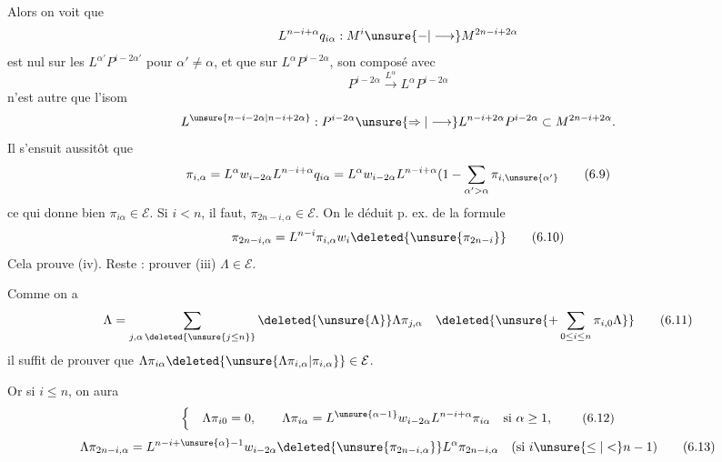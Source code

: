 Alors on voit que
\[
L^{n-i+\alpha}q_{i\alpha}:M^i\unsure{-|\longrightarrow}M^{2n-i+2\alpha}
\]
est nul sur les $L^{\alpha'}P^{i-2\alpha'}$ pour $\alpha'\neq\alpha$, et que sur $L^\alpha P^{i-2\alpha}$,  son composé avec
\[
P^{i-2\alpha}\xrightarrow{L^\alpha}L^\alpha P^{i-2\alpha}
\]
n'est autre que l'isom
\[
L^{\unsure{n-i-2\alpha|n-i+2\alpha}}:P^{i-2\alpha}\unsure{\Rightarrow|\longrightarrow}L^{n-i+2\alpha}P^{i-2\alpha}\subset M^{2n-i+2\alpha}.
\]
Il s'ensuit aussitôt que
\[
\pi_{i,\alpha}=L^\alpha w_{i-2\alpha}L^{n-i+\alpha}q_{i\alpha}=L^\alpha w_{i-2\alpha}L^{n-i+\alpha}(1-\sum_{\alpha'>\alpha}\pi_{i,\unsure{\alpha'}}
\tag{6.9}
\]
ce qui donne bien $\pi_{i\alpha}\in\mathcal E$. 
Si $i<n$, il faut,  $\pi_{2n-i,\alpha}\in\mathcal E$. On
le déduit p. ex. de la formule
\[
\pi_{2n-i,\alpha}=L^{n-i}\pi_{i,\alpha}w_i\deleted{\unsure{\pi_{2n-i}}}
\tag{6.10}
\]
Cela prouve  (iv). Reste : prouver (iii) $\Lambda\in\mathcal E$.

Comme on a
\[
\Lambda=\sum_{j,\alpha\,\deleted{\unsure{j\leq n}}}\deleted{\unsure{\Lambda}}\Lambda\pi_{j,\alpha}\quad\deleted{\unsure{+\sum_{0\leq i\leq n}\pi_{i,0}\Lambda}}
\tag{6.11}
\]
il suffit de prouver que $\Lambda\pi_{i\alpha}\deleted{\unsure{\Lambda\pi_{i,\alpha}|\pi_{i,\alpha}}}\in\mathcal E$.

Or si $i\leq n$, on aura
\[
\left\{\quad\Lambda\pi_{i0}=0,\qquad\Lambda\pi_{i\alpha}=L^{\unsure{\alpha-1}}w_{i-2\alpha}L^{n-i+\alpha}\pi_{i\alpha}\quad\text{si }\alpha\geq1,\right.
\tag{6.12}
\]
\[
\Lambda\pi_{2n-i,\alpha}=L^{n-i+\unsure{\alpha}-1}w_{i-2\alpha}\deleted{\unsure{\pi_{2n-i,\alpha}}}L^\alpha\pi_{2n-i,\alpha}\quad(\text{si }i\unsure{\leq|<}n-1)
\tag{6.13}
\]


